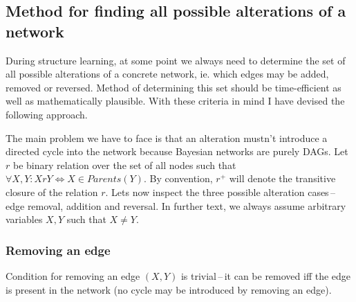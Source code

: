 \documentclass[english,cover]{fitthesis} %
\begin{document}

\subsection{Method for finding all possible alterations of a network}
During structure learning, at some point we always need to determine the set of all possible alterations of a concrete network, ie. which edges may be added, removed or reversed. Method of determining this set should be time-efficient as well as mathematically plausible. With these criteria in mind I have devised the following approach.

The main problem we have to face is that an alteration mustn't introduce a directed cycle into the network because Bayesian networks are purely DAGs. Let $r$ be binary relation over the set of all nodes such that $\forall X,Y: XrY \Leftrightarrow X \in Parents(Y)$. By convention, $r^+$ will denote the transitive closure of the relation $r$. Lets now inspect the three possible alteration cases\,--\,edge removal, addition and reversal. In further text, we always assume arbitrary variables $X,Y$ such that $X \neq Y$.


\subsubsection{Removing an edge}
Condition for removing an edge $(X,Y)$ is trivial\,--\,it can be removed iff the edge is present in the network (no cycle may be introduced by removing an edge).
\end{document}
